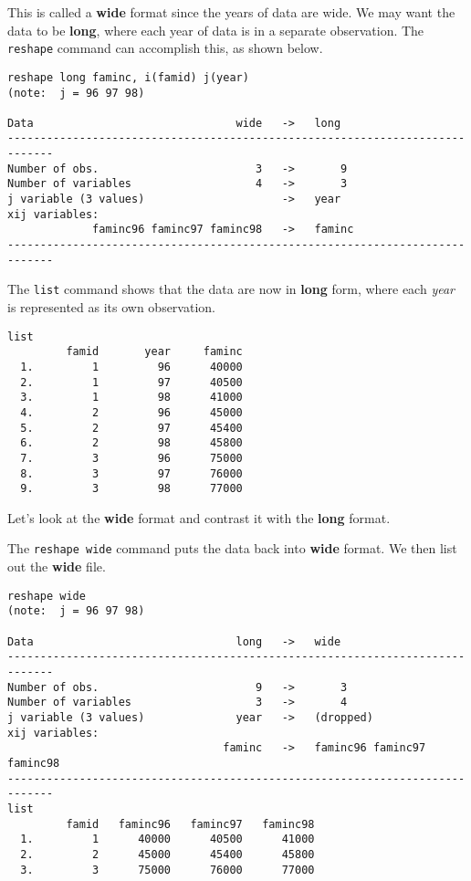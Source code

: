 This is called a \textbf{wide} format since the years of data are wide. We may want the data to be \textbf{long}, where each year of data is in a separate observation. The \lstinline{reshape} command can accomplish this, as shown below.

\begin{lstlisting}
reshape long faminc, i(famid) j(year)
(note:  j = 96 97 98)

Data                               wide   ->   long
-----------------------------------------------------------------------------
Number of obs.                        3   ->       9
Number of variables                   4   ->       3
j variable (3 values)                     ->   year
xij variables:
             faminc96 faminc97 faminc98   ->   faminc
-----------------------------------------------------------------------------
\end{lstlisting}

The \lstinline{list} command shows that the data are now in \textbf{long} form, where each \textit{year} is represented as its own observation.

\begin{lstlisting}
list
         famid       year     faminc
  1.         1         96      40000
  2.         1         97      40500
  3.         1         98      41000
  4.         2         96      45000
  5.         2         97      45400
  6.         2         98      45800
  7.         3         96      75000
  8.         3         97      76000
  9.         3         98      77000
\end{lstlisting}

Let's look at the \textbf{wide} format and contrast it with the \textbf{long} format.

The \lstinline{reshape wide} command puts the data back into \textbf{wide} format. We then list out the \textbf{wide} file.

\begin{lstlisting}
reshape wide
(note:  j = 96 97 98)

Data                               long   ->   wide
-----------------------------------------------------------------------------
Number of obs.                        9   ->       3
Number of variables                   3   ->       4
j variable (3 values)              year   ->   (dropped)
xij variables:
                                 faminc   ->   faminc96 faminc97 faminc98
-----------------------------------------------------------------------------
list
         famid   faminc96   faminc97   faminc98
  1.         1      40000      40500      41000
  2.         2      45000      45400      45800
  3.         3      75000      76000      77000
\end{lstlisting}

